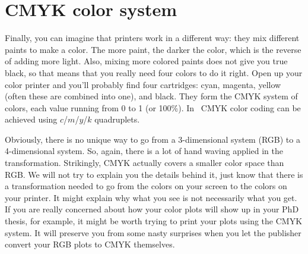 \section{CMYK color system}
Finally, you can imagine that printers work in a different way: they mix different paints to make a color. The more paint, the darker the color, which is the reverse of adding more light. Also, mixing more colored paints does not give you true black, so that means that you really need four colors to do it right. Open up your color printer and you'll probably find four cartridges: cyan, magenta, yellow (often these are combined into one), and black. They form the CMYK system of colors, each value running from 0 to 1 (or 100\%). In \GMT\ CMYK color coding can be achieved using $c$/$m$/$y$/$k$ quadruplets.

Obviously, there is no unique way to go from a 3-dimensional system (RGB) to a 4-dimensional system. So, again, there is a lot of hand waving applied in the transformation. Strikingly, CMYK actually covers a smaller color space than RGB. We will not try to explain you the details behind it, just know that there is a transformation needed to go from the colors on your screen to the colors on your printer. It might explain why what you see is not necessarily what you get. If you are really concerned about how your color plots will show up in your PhD thesis, for example, it might be worth trying to print your plots using the CMYK system. It will preserve you from some nasty surprises when you let the publisher convert your RGB plots to CMYK themselves.
